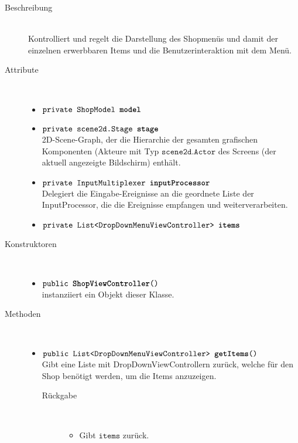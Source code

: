 \begin{description}
\item[Beschreibung] \hfill \\ Kontrolliert und regelt die Darstellung des Shopmenüs und damit der einzelnen erwerbbaren Items und die Benutzerinteraktion mit dem Menü.

\item[Attribute] \hfill \\
	\vspace{-.8cm}
	\begin{itemize}	
		\item $\texttt{private ShopModel \textbf{model}}$ \\ 
		\item $\texttt{private scene2d.Stage \textbf{stage}}$ \\ 2D-Scene-Graph, der die Hierarchie der gesamten grafischen Komponenten (Akteure mit Typ $\texttt{scene2d.Actor}$ des Screens (der aktuell angezeigte Bildschirm) enthält. 
		\item $\texttt{private InputMultiplexer \textbf{inputProcessor}}$ \\ Delegiert die Eingabe-Ereignisse an die geordnete Liste der InputProcessor, die die Ereignisse empfangen und weiterverarbeiten.
		\item $\texttt{private List<DropDownMenuViewController> \textbf{items}}$ \\ 
		\end{itemize}
	
\item[Konstruktoren] \hfill \\
	\vspace{-.8cm}
	\begin{itemize}
		\item $\texttt{public \textbf{ShopViewController}()}$ \\ instanziiert ein Objekt dieser Klasse.

	\end{itemize}
	
\item[Methoden] \hfill \\
	\vspace{-.8cm}
	\begin{itemize}
		\item $\texttt{public List<DropDownMenuViewController> \textbf{getItems}()}$ \\ Gibt eine Liste mit DropDownViewControllern zurück, welche für den Shop benötigt werden, um die Items anzuzeigen.
		\begin{description}
			\item[Rückgabe] \hfill \\
			\vspace{-.8cm}
			\begin{itemize}
				\item Gibt $\texttt{items}$ zurück.
			\end{itemize}
			\end{description}
		

\end{itemize}
\end{description}
